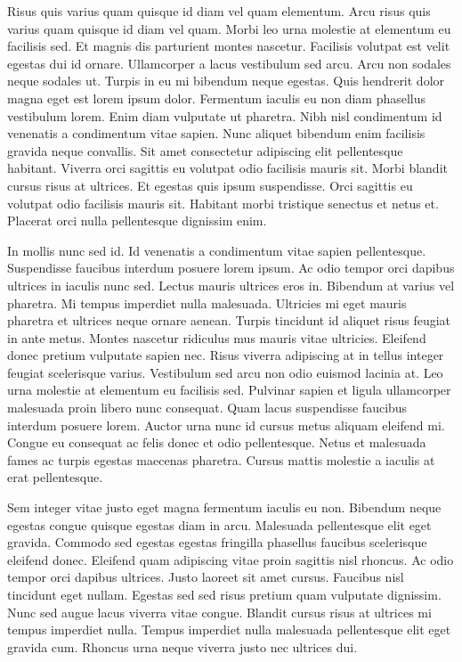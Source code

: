 \documentclass[12pt,ngerman,a4paper,oneside,,tablecaptionabove]{scrbook}
\begin{document}
Risus quis varius quam quisque id diam vel quam elementum. Arcu risus
quis varius quam quisque id diam vel quam. Morbi leo urna molestie at
elementum eu facilisis sed. Et magnis dis parturient montes nascetur.
Facilisis volutpat est velit egestas dui id ornare. Ullamcorper a lacus
vestibulum sed arcu. Arcu non sodales neque sodales ut. Turpis in eu mi
bibendum neque egestas. Quis hendrerit dolor magna eget est lorem ipsum
dolor. Fermentum iaculis eu non diam phasellus vestibulum lorem. Enim
diam vulputate ut pharetra. Nibh nisl condimentum id venenatis a
condimentum vitae sapien. Nunc aliquet bibendum enim facilisis gravida
neque convallis. Sit amet consectetur adipiscing elit pellentesque
habitant. Viverra orci sagittis eu volutpat odio facilisis mauris sit.
Morbi blandit cursus risus at ultrices. Et egestas quis ipsum
suspendisse. Orci sagittis eu volutpat odio facilisis mauris sit.
Habitant morbi tristique senectus et netus et. Placerat orci nulla
pellentesque dignissim enim.

In mollis nunc sed id. Id venenatis a condimentum vitae sapien
pellentesque. Suspendisse faucibus interdum posuere lorem ipsum. Ac odio
tempor orci dapibus ultrices in iaculis nunc sed. Lectus mauris ultrices
eros in. Bibendum at varius vel pharetra. Mi tempus imperdiet nulla
malesuada. Ultricies mi eget mauris pharetra et ultrices neque ornare
aenean. Turpis tincidunt id aliquet risus feugiat in ante metus. Montes
nascetur ridiculus mus mauris vitae ultricies. Eleifend donec pretium
vulputate sapien nec. Risus viverra adipiscing at in tellus integer
feugiat scelerisque varius. Vestibulum sed arcu non odio euismod lacinia
at. Leo urna molestie at elementum eu facilisis sed. Pulvinar sapien et
ligula ullamcorper malesuada proin libero nunc consequat. Quam lacus
suspendisse faucibus interdum posuere lorem. Auctor urna nunc id cursus
metus aliquam eleifend mi. Congue eu consequat ac felis donec et odio
pellentesque. Netus et malesuada fames ac turpis egestas maecenas
pharetra. Cursus mattis molestie a iaculis at erat pellentesque.

Sem integer vitae justo eget magna fermentum iaculis eu non. Bibendum
neque egestas congue quisque egestas diam in arcu. Malesuada
pellentesque elit eget gravida. Commodo sed egestas egestas fringilla
phasellus faucibus scelerisque eleifend donec. Eleifend quam adipiscing
vitae proin sagittis nisl rhoncus. Ac odio tempor orci dapibus ultrices.
Justo laoreet sit amet cursus. Faucibus nisl tincidunt eget nullam.
Egestas sed sed risus pretium quam vulputate dignissim. Nunc sed augue
lacus viverra vitae congue. Blandit cursus risus at ultrices mi tempus
imperdiet nulla. Tempus imperdiet nulla malesuada pellentesque elit eget
gravida cum. Rhoncus urna neque viverra justo nec ultrices dui.
\end{document}
